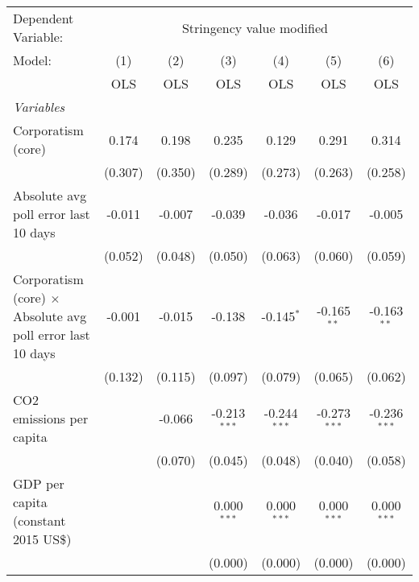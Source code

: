 
\begingroup
\centering
\begin{tabular}{lcccccc}
   \toprule
   Dependent Variable: & \multicolumn{6}{c}{Stringency value modified}\\
   Model:                                                            & (1)     & (2)     & (3)            & (4)            & (5)            & (6)\\  
                                                                     &  OLS    & OLS     & OLS            & OLS            & OLS            & OLS\\  
   \midrule
   \emph{Variables}\\
   Corporatism (core)                                                & 0.174   & 0.198   & 0.235          & 0.129          & 0.291          & 0.314\\   
                                                                     & (0.307) & (0.350) & (0.289)        & (0.273)        & (0.263)        & (0.258)\\   
   Absolute avg poll error last 10 days                              & -0.011  & -0.007  & -0.039         & -0.036         & -0.017         & -0.005\\   
                                                                     & (0.052) & (0.048) & (0.050)        & (0.063)        & (0.060)        & (0.059)\\   
   Corporatism (core) $\times$ Absolute avg poll error last 10 days  & -0.001  & -0.015  & -0.138         & -0.145$^{*}$   & -0.165$^{**}$  & -0.163$^{**}$\\   
                                                                     & (0.132) & (0.115) & (0.097)        & (0.079)        & (0.065)        & (0.062)\\   
   CO2 emissions per capita                                          &         & -0.066  & -0.213$^{***}$ & -0.244$^{***}$ & -0.273$^{***}$ & -0.236$^{***}$\\   
                                                                     &         & (0.070) & (0.045)        & (0.048)        & (0.040)        & (0.058)\\   
   GDP per capita (constant 2015 US\$)                               &         &         & 0.000$^{***}$  & 0.000$^{***}$  & 0.000$^{***}$  & 0.000$^{***}$\\   
                                                                     &         &         & (0.000)        & (0.000)        & (0.000)        & (0.000)\\   

\end{tabular}
